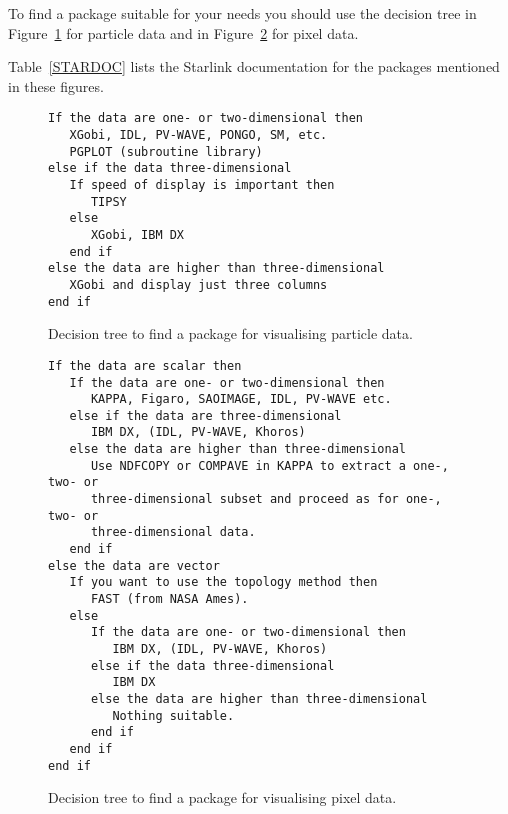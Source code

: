 To find a package suitable for your needs you should use the decision
tree in Figure~\ref{DECPART} for particle data and in
Figure~\ref{DECPIX} for pixel data. 
\begin{latexonly}
Table~\ref{STARDOC} lists the Starlink documentation for the packages
mentioned in these figures.
\end{latexonly}

\begin{figure}[htbp]

\begin{verbatim}
If the data are one- or two-dimensional then
   XGobi, IDL, PV-WAVE, PONGO, SM, etc.
   PGPLOT (subroutine library)
else if the data three-dimensional
   If speed of display is important then
      TIPSY
   else
      XGobi, IBM DX
   end if
else the data are higher than three-dimensional
   XGobi and display just three columns
end if
\end{verbatim}

\caption[Decision tree to find a package for visualising particle 
data.]{Decision tree to find a package for visualising particle data.
\label{DECPART} }

\end{figure}


\begin{figure}[htbp]


\begin{verbatim}
If the data are scalar then
   If the data are one- or two-dimensional then
      KAPPA, Figaro, SAOIMAGE, IDL, PV-WAVE etc.
   else if the data are three-dimensional
      IBM DX, (IDL, PV-WAVE, Khoros)
   else the data are higher than three-dimensional
      Use NDFCOPY or COMPAVE in KAPPA to extract a one-, two- or
      three-dimensional subset and proceed as for one-, two- or
      three-dimensional data.
   end if
else the data are vector
   If you want to use the topology method then
      FAST (from NASA Ames).
   else
      If the data are one- or two-dimensional then
         IBM DX, (IDL, PV-WAVE, Khoros)
      else if the data three-dimensional
         IBM DX
      else the data are higher than three-dimensional
         Nothing suitable.
      end if
   end if
end if
\end{verbatim}

\caption[Decision tree to find a package for visualising pixel 
data.]{Decision tree to find a package for visualising pixel data.
\label{DECPIX} }

\end{figure}



